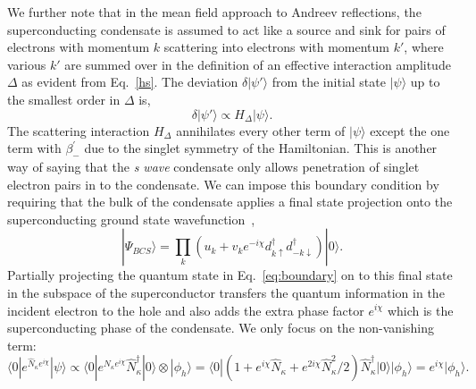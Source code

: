 \documentclass[10pt,letterpaper,aps,onecolumn,superscriptaddress,floatfix,notitlepage]{revtex4-1}
\begin{document}
	We further note that in the mean field approach to Andreev reflections, the superconducting condensate is assumed to act like a source and sink for pairs of electrons with momentum $k$ scattering into electrons with momentum $k'$, where various $k'$ are summed over in the definition of an effective interaction amplitude $\Delta$ as evident from Eq.~\eqref{hs}. The deviation $\delta|\psi'\rangle$ from the initial state $|\psi\rangle$ up to the smallest order in $\Delta$ is,  
	\begin{equation}
	\delta|\psi'\rangle \propto H_{\Delta}|\psi\rangle.
	\end{equation}
	The scattering interaction $H_{\Delta}$ annihilates every other term of $|\psi\rangle$ except the one term with $\beta^{'}_{-}$ due to the singlet symmetry of the Hamiltonian. This is another way of saying that the \textit{s wave} condensate only allows penetration of singlet electron pairs in to the condensate. 
	We can impose this boundary condition by requiring that the bulk of the condensate applies a final state projection onto the superconducting ground state wavefunction~\cite{BCS}, 	\begin{equation}\label{bcsstate}|\Psi_{BCS}\rangle = \prod_{k}(u_{k}+v_{k}e^{-i\chi} d_{k\uparrow}^{\dagger}d_{-k\downarrow}^{\dagger})|0\rangle.\end{equation}
	Partially projecting the quantum state in Eq.~\eqref{eq:boundary} on to this final state in the subspace of the superconductor transfers the quantum information in the incident electron to the hole and also adds the extra phase factor $e^{i\chi}$ which is the superconducting phase of the condensate. We only focus on the non-vanishing term:
	\begin{equation}\langle0|e^{\hat{N}_{\kappa}e^{i\chi}}|\psi\rangle \propto \langle0|e^{\hat{N}_{\kappa}e^{i\chi}}\hat{N}_{\kappa}^{\dagger}|0\rangle\otimes|\phi_{h}\rangle =\langle 0|(1+ e^{i\chi}\hat{N}_{\kappa}+e^{2i\chi}\hat{N}_{\kappa}^{2}/2)\hat{N}_{\kappa}^{\dagger}|0\rangle|\phi_{h}\rangle = e^{i\chi}|\phi_{h}\rangle.\end{equation}
\end{document}
